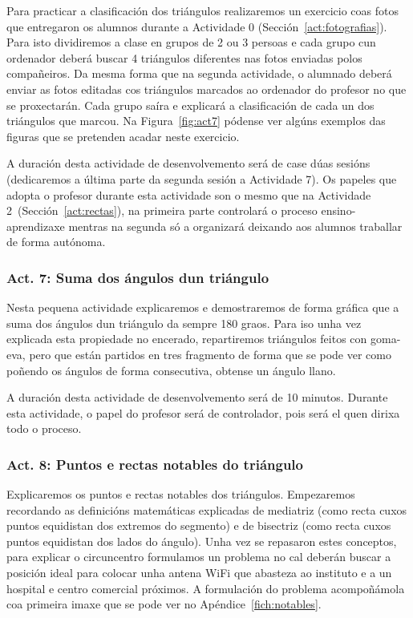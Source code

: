 Para practicar a clasificación dos triángulos realizaremos un exercicio coas fotos que entregaron os alumnos durante a Actividade 0 (Sección~\ref{act:fotografias}). Para isto dividiremos a clase en grupos de 2 ou 3 persoas e cada grupo cun ordenador deberá buscar 4 triángulos diferentes nas fotos enviadas polos compañeiros. Da mesma forma que na segunda actividade, o alumnado deberá enviar as fotos editadas cos triángulos marcados ao ordenador do profesor no que se proxectarán. Cada grupo saíra e explicará a clasificación de cada un dos triángulos que marcou. Na Figura~\ref{fig:act7} pódense ver algúns exemplos das figuras que se pretenden acadar neste exercicio.

A duración desta actividade de desenvolvemento será de case dúas sesións (dedicaremos a última parte da segunda sesión a Actividade 7). Os papeles que adopta o profesor durante esta actividade son o mesmo que na Actividade 2~(Sección~\ref{act:rectas}), na primeira parte controlará o proceso ensino-aprendizaxe mentras na segunda só a organizará deixando aos alumnos traballar de forma autónoma.

\subsubsection{Act. 7: Suma dos ángulos dun triángulo}\label{act:sumangulos}
Nesta pequena actividade explicaremos e demostraremos de forma gráfica que a suma dos ángulos dun triángulo da sempre 180 graos. Para iso unha vez explicada esta propiedade no encerado, repartiremos triángulos feitos con goma-eva, pero que están partidos en tres fragmento de forma que se pode ver como poñendo os ángulos de forma consecutiva, obtense un ángulo llano.

A duración desta actividade de desenvolvemento será de 10 minutos. Durante esta actividade, o papel do profesor será de controlador, pois será el quen dirixa todo o proceso.

\subsubsection{Act. 8: Puntos e rectas notables do triángulo}\label{act:rectasnotables}
Explicaremos os puntos e rectas notables dos triángulos. Empezaremos recordando as definicións matemáticas explicadas de mediatriz (como recta cuxos puntos equidistan dos extremos do segmento) e de bisectriz (como recta cuxos puntos equidistan dos lados do ángulo). Unha vez se repasaron estes conceptos, para explicar o circuncentro formulamos un problema no cal deberán buscar a posición ideal para colocar unha antena WiFi que abasteza ao instituto e a un hospital e centro comercial próximos. A formulación do problema acompoñámola coa primeira imaxe que se pode ver no Apéndice~\ref{fich:notables}.

